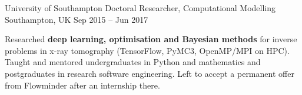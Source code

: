 \begin{cventries}
  \cventry
    {University of Southampton} %
    {Doctoral Researcher, Computational Modelling} %
    {Southampton, UK} %
    {Sep 2015 -- Jun 2017} %
    {
      \begin{cvitems} %
        \item {Researched \textbf{deep learning, optimisation and Bayesian methods} for inverse problems in x-ray tomography (TensorFlow, PyMC3, OpenMP/MPI on HPC). Taught and mentored undergraduates in Python and mathematics and postgraduates in research software engineering. Left to accept a permanent offer from Flowminder after an internship there.}
      \end{cvitems}
    }

\end{cventries}
